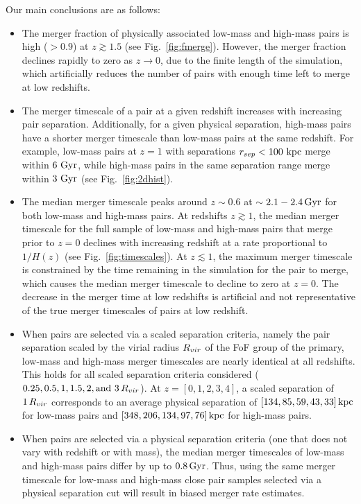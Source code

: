 \documentclass[twocolumn,linenumbers]{aastex631}
\begin{document}
    Our main conclusions are as follows: 
    \begin{itemize}
        \item The merger fraction of physically associated low-mass and high-mass pairs is high ($>0.9$) at $z\gtrsim1.5$ (see Fig.~\ref{fig:fmerge}). However, the merger fraction declines rapidly to zero as $z\to0$, due to the finite length of the simulation, which artificially reduces the number of pairs with enough time left to merge at low redshifts. %
        \item The merger timescale of a pair at a given redshift increases with increasing pair separation. Additionally, for a given physical separation, high-mass pairs have a shorter merger timescale than low-mass pairs at the same redshift. For example, low-mass pairs at $z=1$ with separations $r_{sep}<100\,\mathrm{\,kpc}$ merge within $6\, \mathrm{\,Gyr}$, while high-mass pairs in the same separation range merge within $3\, \mathrm{\,Gyr}$ (see Fig.~\ref{fig:2dhist}).
        \item 
        The median merger timescale peaks around $z\sim0.6$ at $\sim2.1-2.4\mathrm{\,Gyr}$ for both low-mass and high-mass pairs.
        At redshifts $z\gtrsim1$, the median merger timescale for the full sample of low-mass and high-mass pairs that merge prior to $z=0$ declines with increasing redshift at a rate proportional to $1/H(z)$ (see Fig.~\ref{fig:timescales}). 
        At $z\lesssim1$, the maximum merger timescale is constrained by the time remaining in the simulation for the pair to merge, which causes the median merger timescale to decline to zero at $z=0$. 
        The decrease in the merger time at low redshifts is artificial and not representative of the true merger timescales of pairs at low redshift.
        \item When pairs are selected via a scaled separation criteria, namely the pair separation scaled by the virial radius $R_{vir}$ of the FoF group of the primary, low-mass and high-mass merger timescales are nearly identical at all redshifts. This holds for all scaled separation criteria considered ($0.25,0.5,1,1.5,2,\mbox{and }3\,R_{vir}$). At $z=[0, 1, 2, 3, 4]$, a scaled separation of $1\,R_{vir}$ corresponds to an average physical separation of $[134, 85, 59, 43, 33]\mathrm{\,kpc}$ for low-mass pairs and $[348, 206, 134, 97, 76] \mathrm{\,kpc}$ for high-mass pairs.
        \item When pairs are selected via a physical separation criteria (one that does not vary with redshift or with mass), the median merger timescales of low-mass and high-mass pairs differ by up to $0.8\mathrm{\,Gyr}$. Thus, using the same merger timescale for low-mass and high-mass close pair samples selected via a physical separation cut will result in biased merger rate estimates.
    \end{itemize}
\end{document}
